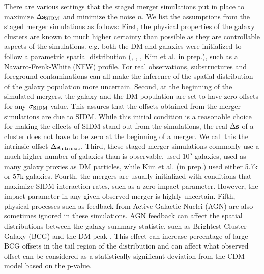 There are various settings that the staged merger simulations put in place to maximize
$\Delta {\bf s}_{{\rm SIDM}}$ and minimize the noise $n$. 
We list the assumptions from the staged merger simulations as follows: 
First, the physical properties of the galaxy
clusters are known to much higher certainty than possible as they are
controllable aspects of the simulations. e.g. both the DM and 
galaxies were initialized to follow a parametric spatial 
distribution   
(\citealt{Randall2008d}, \citealt{Kahlhoefer14}, \citealt{Robertson2016}, Kim
et al. in prep.), 
such as a Navarro-Frenk-White (NFW) profile. For real observations,
substructures and foreground
contaminations can all make the inference of the spatial distribution 
of the galaxy population more uncertain. 
Second, at the beginning of the simulated mergers, the galaxy and the DM
population are set to have zero offsets for any $\sigma_{\rm SIDM}$ value. 
This assures that the offsets obtained from the merger simulations are due to SIDM. 
While this initial condition 
is a reasonable choice for making the effects of SIDM stand out from the simulations, 
the real $\Delta {\bf s}$ of a cluster does not have to be zero at the 
beginning of a merger. We call this the intrinsic offset $\Delta {\bf s}_{\rm
intrinsic}$.
Third, these staged merger simulations commonly use a much higher number of 
galaxies than is observable. \cite{Randall2008d} used
$10^5$ galaxies, \cite{Kahlhoefer14} used as many galaxy proxies as DM particles, 
while Kim et al. (in prep.) used either 5.7k or 57k galaxies. 
Fourth, the mergers are usually initialized with conditions that maximize SIDM
interaction rates, such as a zero impact parameter. However, the impact
parameter in any given observed merger is highly uncertain. 
Fifth, physical processes such as feedback from Active
Galactic Nuclei (AGN) are also sometimes ignored in these simulations. 
AGN feedback can affect the spatial distributions between the galaxy summary
statistic, such as  Brightest Cluster
Galaxy (BCG) and  
the DM peak \citep{Cui2015}. This effect can increase percentage of large 
BCG offsets in the tail region of the distribution and can affect what observed offset can be 
considered as a statistically significant deviation from the CDM model based on the p-value. 


